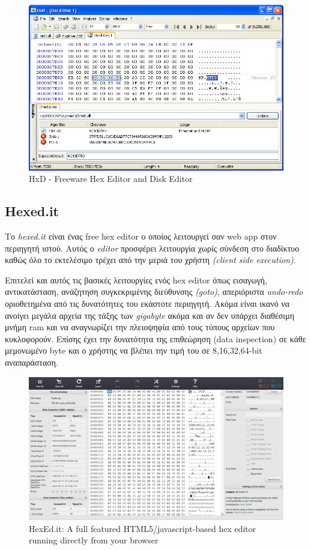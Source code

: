 \begin{figure}[ht]
\centering
\includegraphics[scale=0.5]{static/hxd.png}
\caption{HxD - Freeware Hex Editor and Disk Editor}
\end{figure}

\pagebreak
\subsection{Hexed.it}
Το \emph{hexed.it}\cite{hexedit} είναι ένας free hex editor ο οποίος λειτουργεί σαν web app στον περιηγητή ιστού.
Αυτός ο \emph{editor} προσφέρει λειτουργία χωρίς σύνδεση στο διαδίκτυο καθώς όλο το εκτελέσιμο τρέχει από την μεριά του χρήστη \emph{(client side execution)}.

Επιτελεί και αυτός τις βασικές λειτουργίες ενός hex editor όπως εισαγωγή, αντικατάσταση, ανάζητηση συγκεκριμένης διεύθυνσης \emph{(goto)}, απεριόριστα \emph{undo-redo} οριοθετημένα από τις δυνατότητες του εκάστοτε περιηγητή.
Ακόμα είναι ικανό να ανοίγει μεγάλα αρχεία της τάξης των \emph{gigabyte} ακόμα και αν δεν υπάρχει διαθέσιμη μνήμη ram και να αναγνωρίζει την πλειοψηφία από τους τύπους αρχείων που κυκλοφορούν.
Επίσης έχει την δυνατότητα της επιθεώρηση (data inspection) σε κάθε μεμονωμένο byte και ο χρήστης να βλέπει την τιμή του σε 8,16,32,64-bit αναπαράσταση.

\begin{figure}[ht]
\centering
\includegraphics[scale=0.5]{static/hexedit.png}

\caption{HexEd.it: A full featured HTML5/javascript-based hex editor running directly from your browser}
\end{figure}

